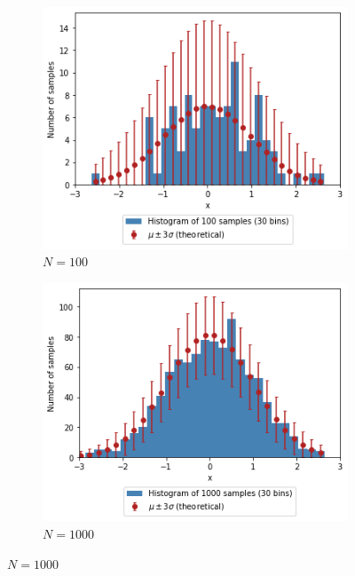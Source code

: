 \documentclass[a4paper]{article}
\begin{document}
\begin{figure}[h]
    \centering
    \begin{subfigure}[b]{0.3\textwidth}
        \centering
        \includegraphics[width=\textwidth]{figures/gaussian_histogram_100.png}
        \caption{$N=100$}
        \label{fig:gaussian_histogram_100}
    \end{subfigure}
    \hfill
    \begin{subfigure}[b]{0.3\textwidth}
        \centering
        \includegraphics[width=\textwidth]{figures/gaussian_histogram_1000.png}
        \caption{$N=1000$}
        \label{fig:gaussian_histogram_1000}
    \end{subfigure}

\end{figure}
\end{document}
